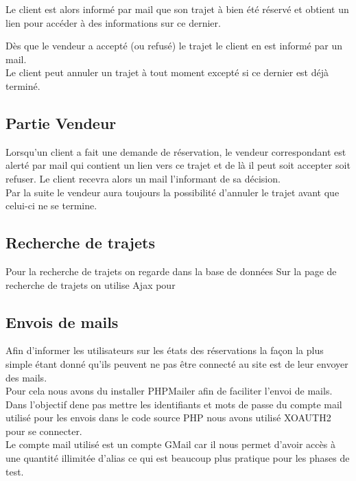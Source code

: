 \documentclass{article}
\begin{document}
        Le client est alors informé par mail que son trajet à bien été réservé et obtient un lien pour accéder à des informations sur ce dernier.
        
        Dès que le vendeur a accepté (ou refusé) le trajet le client en est informé par un mail.
        \\
        
        Le client peut annuler un trajet à tout moment excepté si ce dernier est déjà terminé.
    
    \subsection{Partie Vendeur}
        Lorsqu'un client a fait une demande de réservation, le vendeur correspondant est alerté par mail qui contient un lien vers ce trajet et de là il peut soit accepter soit refuser. Le client recevra alors un mail l'informant de sa décision.
        \\
        
        Par la suite le vendeur aura toujours la possibilité d'annuler le trajet avant que celui-ci ne se termine.
        
    \subsection{Recherche de trajets}
        Pour la recherche de trajets on regarde dans la base de données
        Sur la page de recherche de trajets on utilise Ajax pour 
            
            
    \subsection{Envois de mails}
        Afin d'informer les utilisateurs sur les états des réservations la façon la plus simple étant donné qu'ils peuvent ne pas être connecté au site est de leur envoyer des mails.
        \\
        
        Pour cela nous avons du installer PHPMailer afin de faciliter l'envoi de mails.
        Dans l'objectif dene pas mettre les identifiants et mots de passe du compte mail utilisé pour les envois dans le code source PHP nous avons utilisé XOAUTH2 pour se connecter.
        \\
        
        Le compte mail utilisé est un compte GMail car il nous permet d'avoir accès à une quantité illimitée d'alias ce qui est beaucoup plus pratique pour les phases de test.
    
\end{document}
